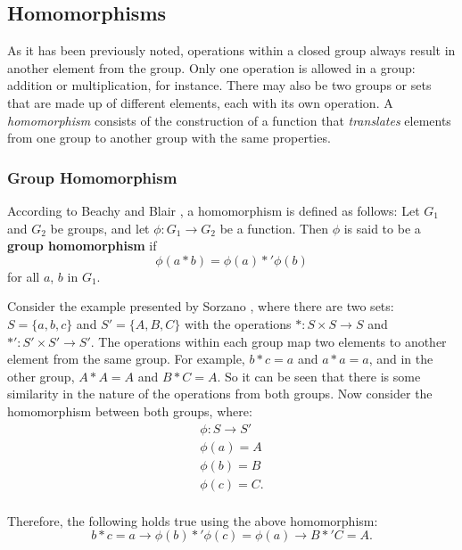 \subsection{Homomorphisms}

As it has been previously noted, operations within a closed group always result in another element from the group. Only one operation is allowed in a group: addition or multiplication, for instance. There may also be two groups or sets that are made up of different elements, each with its own operation. A \emph{homomorphism} consists of the construction of a function that \emph{translates} elements from one group to another group with the same properties.

\subsubsection{Group Homomorphism}

According to Beachy and Blair \cite{beachy2006abstract}, a homomorphism is defined as follows: Let $G_{1}$ and $G_{2}$ be groups, and let $\phi: G_{1} \rightarrow G_{2}$ be a function. Then $\phi$ is said to be a \textbf{group homomorphism} if
\begin{equation}
\phi(a*b) = \phi(a) *' \phi(b)
\end{equation}
for all $a$, $b$ in $G_{1}$.

Consider the example presented by Sorzano \cite{sorzano2013}, where there are two sets: $S= \{a, b, c\}$ and $S' = \{A, B, C\}$  with the operations $*: S \times S \rightarrow S$ and $*' : S' \times S' \rightarrow S'$. The operations within each group map two elements to another element from the same group. For example, $b*c=a$ and $a*a=a$, and in the other group, $A*A = A$ and $B*C=A$. So it can be seen that there is some similarity in the nature of the operations from both groups. Now consider the homomorphism between both groups, where:
\[
\begin{split}
  \phi: S \rightarrow S' \\
  \phi(a) = A \\
  \phi(b) = B \\
  \phi(c) = C. \\
\end{split}
\]

\noindent Therefore, the following holds true using the above homomorphism:
\begin{equation}
b*c=a \rightarrow \phi(b) *' \phi(c) = \phi(a) \rightarrow B *' C = A.
\end{equation}

